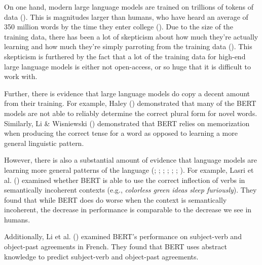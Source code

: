 \documentclass[
  12pt,
  letterpaper,
]{scrreprt}
\begin{document}
On one hand, modern large language models are trained on trillions of
tokens of data
(). This is magnitudes larger than humans, who have heard an average
of 350 million words by the time they enter college
(). Due to the size of the training data, there has been a lot of
skepticism about how much they're actually learning and how much they're
simply parroting from the training data
(). This skepticism is furthered by the fact that a lot of the
training data for high-end large language models is either not
open-access, or so huge that it is difficult to work with.

Further, there is evidence that large language models do copy a decent
amount from their training. For example, Haley
() demonstrated that many of
the BERT models are not able to reliably determine the correct plural
form for novel words. Similarly, Li \& Wisniewski
() demonstrated that BERT
relies on memorization when producing the correct tense for a word as
opposed to learning a more general linguistic pattern.

However, there is also a substantial amount of evidence that language
models are learning more general patterns of the language
(;
;
;
;
;
; ). For example, Lasri et al.
() examined whether
BERT is able to use the correct inflection of verbs in semantically
incoherent contexts (e.g., \emph{colorless green ideas sleep
furiously}). They found that while BERT does do worse when the context
is semantically incoherent, the decrease in performance is comparable to
the decrease we see in humans.

Additionally, Li et al.
() examined
BERT's performance on subject-verb and object-past agreements in French.
They found that BERT uses abstract knowledge to predict subject-verb and
object-past agreements.
\end{document}
